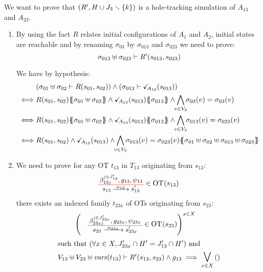 \documentclass[runningheads]{llncs}
\begin{document}
We want to prove that ${\left(R', H\cup J_3 \smallsetminus\{k\}\right)}$ is a hole-tracking simulation of $A_{13}$ and $A_{23}$.
\begin{enumerate}
\item By using the fact $R$ relates initial configurations of  $A_1$ and $A_2$, initial states are reachable and by renaming $\sigma_{03}$ by  $\sigma_{013}$ and  $\sigma_{023}$ we need to prove:
\[\sigma_{013} \uplus \sigma_{023} \vdash R'{\left(s_{013}, s_{023}\right)}\]

We have by hypothesis:
\begin{align*}
& \mpar{\sigma_{01} \uplus \sigma_{02} \vdash R\mpar{s_{01}, s_{02}}} \wedge 
\mpar{\sigma_{013} \vdash \reach{A_{13}}\mpar{s_{013}}}\\
\iff & R\mpar{s_{01}, s_{02}}\psubst{ \sigma_{01} \uplus \sigma_{02}} \wedge \reach{A_{13}}\mpar{s_{013}} \psubst{\sigma_{013}} \wedge \bigwedge_\subbox{v\in V_3} \sigma_{03}(v)=\sigma_{03}(v)\\
\iff & R\mpar{s_{01}, s_{02}}\psubst{ \sigma_{01} \uplus \sigma_{02}} \wedge \reach{A_{13}}\mpar{s_{013}} \psubst{\sigma_{013}} \wedge \bigwedge_\subbox{v\in V_3} \sigma_{013}(v)=\sigma_{023}(v)\\
\iff & R\mpar{s_{01}, s_{02}} \wedge \reach{A_{13}}\mpar{s_{013}}  \wedge \bigwedge_\subbox{v\in V_3} \sigma_{013}(v)=\sigma_{023}(v) \psubst{ \sigma_{01} \uplus \sigma_{02} \uplus \sigma_{013} \uplus \sigma_{023}}
\end{align*}
\item We need to prove for any OT $t_{13}$ in $T_{13}$ originating from $s_{13}$:
\begin{align*}
		&  \OTx{13}{}{13}{13} \in \fOT{s_{13}}
\end{align*}		
there exists an indexed family $t_{23x}$ of OTs originating from $s_{23}$: 
\begin{align*}
		&  \mpar{\OTx{23}{x}{23x}{23x} \in \fOT{s_{23}}}^{x \in X}
\end{align*}	
\begin{align*}		
		& \text{such that } \mpar{\forall x \in X, J'_{23x} \cap H' = J'_{13} \cap H'} \text{ and }\\
		&  V_{13} \uplus V_{23} \uplus \fvars{t_{13}} \vdash R'\mpar{s_{13}, s_{23}} \wedge g_{13} \implies \operatorname*{\bigsymb{\bigvee}}_{x \in X} \mpar{\everymath{\displaystyle}\begin{array}{l}

\end{array}}
\end{align*}
\end{enumerate}
\end{document}
